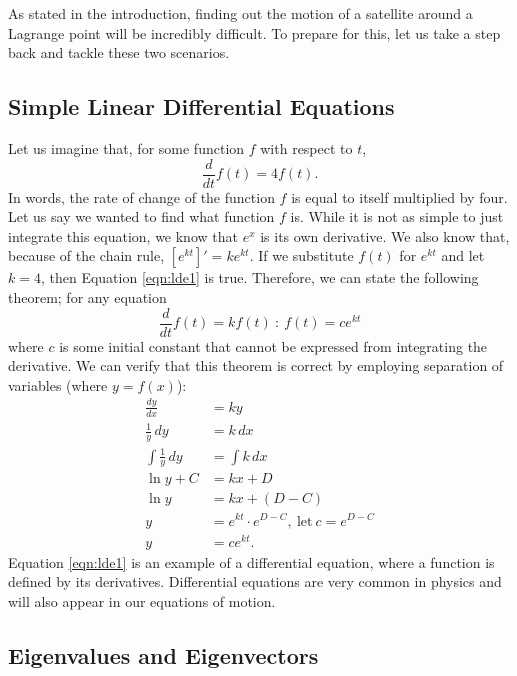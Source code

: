 As stated in the introduction, finding out the motion of a satellite around a Lagrange point will be incredibly difficult.
To prepare for this, let us take a step back and tackle these two scenarios.

\subsection{Simple Linear Differential Equations} \label{sec:ode}

Let us imagine that, for some function $f$ with respect to $t$,
\begin{equation}\label{eqn:lde1}
	\frac{d}{dt}f(t) = 4f(t)\text{.}
\end{equation}
In words, the rate of change of the function $f$ is equal to itself multiplied by four. Let us say we wanted to find what function $f$ is.
While it is not as simple to just integrate this equation, we know that $e^x$ is its own derivative.
We also know that, because of the chain rule, $[e^{kt}]' = ke^{kt}$.
If we substitute $f(t)$ for $e^{kt}$ and let $k = 4$, then Equation \eqref{eqn:lde1} is true.
Therefore, we can state the following theorem; for any equation
\begin{equation}\label{eqn:theory1}
	\frac{d}{dt}f(t) = kf(t)\ :\ f(t) = ce^{kt}
\end{equation}
where $c$ is some initial constant that cannot be expressed from integrating the derivative.
We can verify that this theorem is correct by employing separation of variables (where $y = f(x)$):
\begin{align*}
	\frac{dy}{dx} &= ky \\
	\frac{1}{y}\, dy &= k\, dx \\
	\int \frac{1}{y}\, dy &= \int k\, dx \\
	\ln y + C &= kx + D \\
	\ln y &= kx + (D - C) \\
	y &= e^{kt} \cdot e^{D - C},\ \text{let}\ c = e^{D - C} \\
	y &= ce^{kt} \text{.}
\end{align*}
Equation \eqref{eqn:lde1} is an example of a differential equation, where a function is defined by its derivatives. Differential equations are very common in physics and will also appear in our equations of motion.

\subsection{Eigenvalues and Eigenvectors} \label{sec:eigens}

